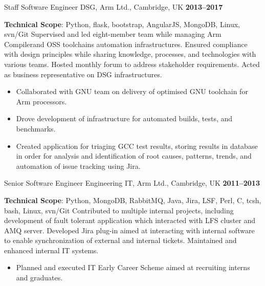 \documentclass[10pt,a4paper,sans]{moderncv}
\begin{document}
\cventry{}
    {Staff Software Engineer}
    {DSG, Arm Ltd., Cambridge, UK}
    {\textbf{2013--2017}}
    {}
    {\textbf{Technical Scope}: Python, flask, bootstrap, AngularJS, MongoDB,
    Linux, svn/Git\newline
    Supervised and led eight-member team while managing Arm Compilerand OSS
    toolchains automation infrastructures. Ensured compliance with design
    principles while sharing knowledge, processes, and technologies with
    various teams. Hosted monthly forum to address stakeholder requirements.
    Acted as business representative on DSG infrastructures.
    \begin{itemize}
        \item Collaborated with GNU team on delivery of optimised GNU toolchain
            for Arm processors.
        \item Drove development of infrastructure for automated builds, tests,
            and benchmarks.
        \item Created application for triaging GCC test results, storing
            results in database in order for analysis and identification of
            root causes, patterns, trends, and automation of issue tracking
            using Jira.
    \end{itemize}}

\cventry{}
    {Senior Software Engineer}
    {Engineering IT, Arm Ltd., Cambridge, UK}
    {\textbf{2011--2013}}
    {}
    {\textbf{Technical Scope}: Python, MongoDB, RabbitMQ, Java, Jira, LSF,
    Perl, C, tcsh, bash, Linux, svn/Git\newline
    Contributed to multiple internal projects, including development of fault
    tolerant application which interacted with LFS cluster and AMQ server.
    Developed Jira plug-in aimed at interacting with internal software to
    enable synchronization of external and internal tickets. Maintained and
    enhanced internal IT systems.
    \begin{itemize}
        \item Planned and executed IT Early Career Scheme aimed at recruiting
            interns and graduates.
    \end{itemize}}
\end{document}
